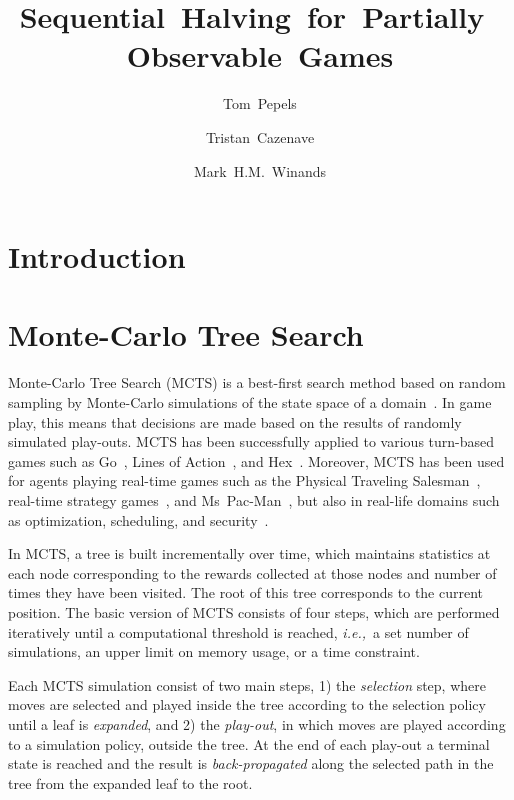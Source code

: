 \documentclass[a4paper]{llncs}
\title{Sequential~Halving~for~Partially~Observable~Games}
\author{Tom~Pepels\inst{1} \and Tristan~Cazenave\inst{2} \and Mark~H.M.~Winands\inst{1}}
\institute{Department of Knowledge Engineering,  Maastricht University\\ \email{\{tom.pepels,m.winands\}@maastrichtuniversity.nl} \and LAMSADE - Université Paris-Dauphine \\ \email{cazenave@lamsade.dauphine.fr}}
\newcommand{\ie}{{\it i.e.,}~}
\begin{document}
\maketitle

\begin{abstract} 

\end{abstract}

\section{Introduction}
\label{sec:intro}

\section{Monte-Carlo Tree Search}
\label{sec:mcts}

Monte-Carlo Tree Search (MCTS) is a best-first search method based on random sampling by Monte-Carlo simulations of the state space of a domain~\cite{coulom2007efficient,kocsis2006bandit}. In game play, this means that decisions are made based on the results of randomly simulated play-outs. MCTS has been successfully applied to various turn-based games such as Go~\cite{lee2010current}, Lines of Action~\cite{Winands2010b}, and Hex~\cite{arneson2010monte}. Moreover, MCTS has been used for agents playing real-time games such as the Physical Traveling Salesman~\cite{powleytsp}, real-time strategy games~\cite{balla2009uct}, and Ms~Pac-Man~\cite{realtime2014}, but also in real-life domains such as optimization, scheduling, and security~\cite{browne2012survey}.

In MCTS, a tree is built incrementally over time, which maintains statistics at each node corresponding to the rewards collected at those nodes and number of times they have been visited. The root of this tree corresponds to the current position. The basic version of MCTS consists of four steps, which are performed iteratively until a computational threshold is reached, \ie a set number of simulations, an upper limit on memory usage, or a time constraint. 

Each MCTS simulation consist of two main steps, 1) the \emph{selection} step, where moves are selected and played inside the tree according to the selection policy until a leaf is \emph{expanded}, and 2) the \emph{play-out}, in which moves are played according to a simulation policy, outside the tree. At the end of each play-out a terminal state is reached and the result is \emph{back-propagated} along the selected path in the tree from the expanded leaf to the root.
\end{document}
